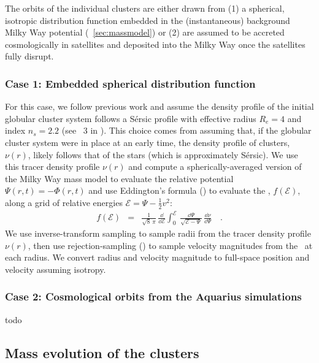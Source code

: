\documentclass[manuscript, letterpaper]{aastex6}
\begin{document}
The orbits of the individual clusters are either drawn from (1) a spherical,
isotropic distribution function embedded in the (instantaneous) background Milky
Way potential (\sectionname~\ref{sec:massmodel}) or (2) are assumed to be
accreted cosmologically in satellites and deposited into the Milky Way once the
satellites fully disrupt.

\subsubsection{Case 1: Embedded spherical distribution function} \label{sec:sphdf}

For this case, we follow previous work and assume the density profile of the
initial globular cluster system follows a S\'ersic profile with effective radius
$R_e=4$ and index $n_s = 2.2$ (see \sectionname~3 in \citealt{Gnedin:2014}).
This choice comes from assuming that, if the globular cluster system were in
place at an early time, the density profile of clusters, $\nu(r)$, likely
follows that of the stars (which is approximately S\'ersic).
We use this tracer density profile $\nu(r)$ and compute a spherically-averaged
version of the Milky Way mass model to evaluate the relative potential
$\Psi(r,t) = -\Phi(r,t)$ and use Eddington's formula
(\citealt{Eddington:1916,Binney:2008}) to evaluate the \df, $f(\mathcal{E})$,
along a grid of relative energies $\mathcal{E} = \Psi - \frac{1}{2}v^2$:
\begin{eqnarray}
  f(\mathcal{E}) &=& \frac{1}{\sqrt{8}\,\pi} \, \frac{\dd}{\dd \mathcal{E}}
    \int_0^\mathcal{E} \, \frac{\dd \Psi}{\sqrt{\mathcal{E} - \Psi}} \,
    \frac{\dd \nu}{\dd \Psi} \quad .
\end{eqnarray}
We use inverse-transform sampling to sample radii from the tracer density
profile $\nu(r)$, then use rejection-sampling (\citealt{vonneumann}) to sample
velocity magnitudes from the \df\ at each radius.
We convert radius and velocity magnitude to full-space position and velocity
assuming isotropy.

\subsubsection{Case 2: Cosmological orbits from the Aquarius simulations} \label{sec:cosmoorbits}

todo

\subsection{Mass evolution of the clusters} \label{sec:mockstreams}
\end{document}
